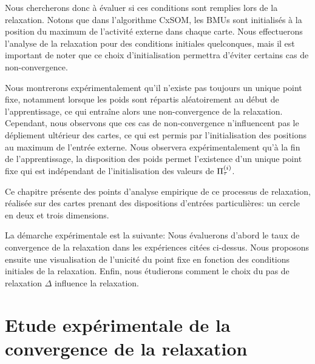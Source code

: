 \documentclass[../main]{subfiles}
\begin{document}
Nous chercherons donc à évaluer si ces conditions sont remplies lors de la relaxation.
Notons que dans l'algorithme CxSOM, les BMUs sont initialisés à la position du maximum de l'activité externe dans chaque carte. Nous effectuerons l'analyse de la relaxation pour des conditions initiales quelconques, mais il est important de noter que ce choix d'initialisation permettra d'éviter certains cas de non-convergence.

Nous montrerons expérimentalement qu'il n'existe pas toujours un unique point fixe, notamment lorsque les poids sont répartis aléatoirement au début de l'apprentissage, ce qui entraîne alors une non-convergence de la relaxation. 
Cependant, nous observons que ces cas de non-convergence n'influencent pas le dépliement ultérieur des cartes, ce qui est permis par l'initialisation des positions au maximum de l'entrée externe.
Nous observera expérimentalement qu'à la fin de l'apprentissage, la disposition des poids permet l'existence d'un unique point fixe qui est indépendant de l'initialisation des valeurs de $\Pi^{({i})}_{\tau}$.

Ce chapitre présente des points d'analyse empirique de ce processus de relaxation, réalisée sur des cartes prenant des dispositions d'entrées particulières: un cercle en deux et trois dimensions.

La démarche expérimentale est la suivante:
Nous évaluerons d'abord le taux de convergence de la relaxation dans les expériences citées ci-dessus.
Nous proposons ensuite une visualisation de l'unicité du point fixe en fonction des conditions initiales de la relaxation. Enfin, nous étudierons comment le choix du pas de relaxation $\Delta$ influence la relaxation.

\section{Etude expérimentale de la convergence de la relaxation}
\end{document}
